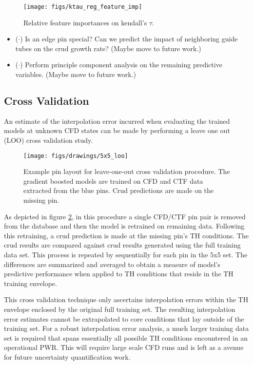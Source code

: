 \begin{figure}[H]
    \centering
    \texttt{[image: figs/ktau\_reg\_feature\_imp]}
    \caption[Relative feature importance.]{Relative feature importances on kendall's $\tau$.}
    \label{fig:ktauregfeatureimp}
\end{figure}

\begin{itemize}
	\item ($\cdot$) Is an edge pin special?  Can we predict the impact of neighboring
	guide tubes on the crud growth rate?  (Maybe move to future work.)
	\item ($\cdot$) Perform principle component analysis on the remaining predictive variables. (Maybe move to future work.)
	
\end{itemize}


\subsection{Cross Validation}

An estimate of the interpolation error incurred when evaluating the trained models at unknown CFD states can be made by performing a leave one out (LOO) cross validation study.

\begin{figure}[h]
    \centering
    \texttt{[image: figs/drawings/5x5\_loo]}
    \caption[Example pin layout for leave-one-out cross validation procedure.]{Example pin layout for leave-one-out cross validation procedure.  The gradient boosted models are trained on CFD and CTF data extracted from the blue pins.  Crud predictions are made on the missing pin.}
    \label{fig:5x5loo}
\end{figure}


As depicted in figure \ref{fig:5x5loo}, in this procedure a single CFD/CTF pin pair is removed from the database and then the model is retrained on remaining data.  Following this retraining, a crud prediction is made 
at the missing pin's TH conditions.  The crud results are compared against crud results generated using the full training data set.  This process is repeated by sequentially for each pin in the 5x5 set.  The differences are summarized and averaged to obtain a measure of model's predictive performance when applied to TH conditions that reside in the TH training envelope.

This cross validation technique only ascertains interpolation errors within the TH envelope enclosed by the original full training set.  The resulting interpolation error estimates cannot be extrapolated to core conditions that lay outside of the training set.  For a robust interpolation error analysis, a much larger training data set is required
that spans essentially all possible TH conditions encountered in an operational PWR.  This will require large scale CFD runs and is left as a avenue for future uncertainty quantification work.

